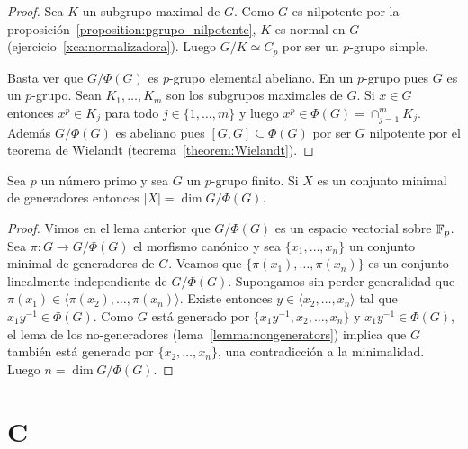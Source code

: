 \begin{proof}
	Sea $K$ un subgrupo maximal de $G$. Como $G$ es nilpotente por la
	proposición~\ref{proposition:pgrupo_nilpotente}, $K$ es normal en $G$
	(ejercicio~\ref{xca:normalizadora}). Luego $G/K\simeq C_p$ por ser un $p$-grupo
	simple. 
	
	Basta ver que $G/\Phi(G)$ es $p$-grupo elemental abeliano. En un $p$-grupo
	pues $G$ es un $p$-grupo.  Sean $K_1,\dots,K_m$ son los subgrupos maximales
	de $G$. Si $x\in G$ entonces $x^p\in K_j$ para todo $j\in\{1,\dots,m\}$ y
	luego $x^p\in\Phi(G)=\cap_{j=1}^m K_j$. Además $G/\Phi(G)$ es abeliano pues
	$[G,G]\subseteq \Phi(G)$ por ser $G$ nilpotente por el teorema de Wielandt 
	(teorema~\ref{theorem:Wielandt}). 
\end{proof}

\begin{theorem}[Burnside]
	\label{theorem:Burnside:basis}
	Sea $p$ un número primo y sea $G$ un $p$-grupo finito. Si $X$ es un
	conjunto minimal de generadores entonces $|X|=\dim G/\Phi(G)$. 
\end{theorem}


\begin{proof}
	Vimos en el lema anterior que $G/\Phi(G)$ es un espacio
	vectorial sobre $\mathbb{F}_p$. Sea $\pi\colon G\to G/\Phi(G)$ el morfismo canónico
	y sea $\{x_1,\dots,x_n\}$ un conjunto minimal de generadores de $G$.
	Veamos que $\{\pi(x_1),\dots,\pi(x_n)\}$ es un conjunto linealmente
	independiente de $G/\Phi(G)$.  Supongamos sin perder generalidad que
	$\pi(x_1)\in\langle \pi(x_2),\dots,\pi(x_n)\rangle$. Existe entonces $y\in
	\langle x_2,\dots,x_n\rangle$ tal que $x_1y^{-1}\in\Phi(G)$. Como $G$ está
	generado por $\{x_1y^{-1},x_2,\dots,x_n\}$ y $x_1y^{-1}\in\Phi(G)$, el 
	lema de los no-generadores (lema~\ref{lemma:nongenerators}) implica que $G$ también está generado por
	$\{x_2,\dots,x_n\}$, una contradicción a la minimalidad. Luego $n=\dim
	G/\Phi(G)$.
\end{proof}



\section*{C}

